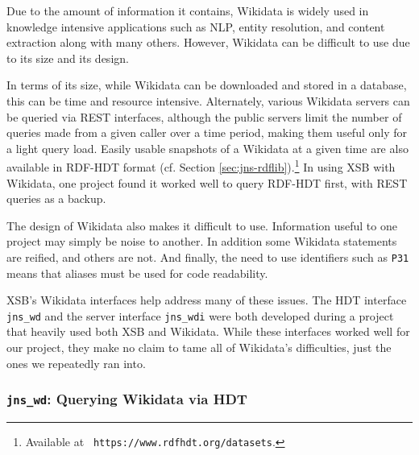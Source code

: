 Due to the amount of information it contains, Wikidata is widely used
in knowledge intensive applications such as NLP, entity resolution,
and content extraction along with many others.  However, Wikidata can
be difficult to use due to its size and its design.

In terms of its size, while Wikidata can be downloaded and stored in a
database, this can be time and resource intensive.  Alternately,
various Wikidata servers can be queried via REST interfaces, although
the public servers limit the number of queries made from a given
caller over a time period, making them useful only for a light query
load.  Easily usable snapshots of a Wikidata at a given time are also
available in RDF-HDT format (cf. Section
\ref{sec:jns-rdflib}).\footnote{Available at {\tt
  https://www.rdfhdt.org/datasets}.}  In using XSB with Wikidata, one
project found it worked well to query RDF-HDT first, with REST queries
as a backup.

The design of Wikidata also makes it difficult to use.  Information
useful to one project may simply be noise to another.  In addition
some Wikidata statements are reified, and others are not.  And
finally, the need to use identifiers such as {\tt P31} means that
aliases must be used for code readability.

XSB's Wikidata interfaces help address many of these issues. The HDT
interface {\tt jns\_wd} and the server interface {\tt jns\_wdi} were
both developed during a project that heavily used both XSB and
Wikidata.  While these interfaces worked well for our project, they
make no claim to tame all of Wikidata's difficulties, just the ones we
repeatedly ran into.

\subsubsection{{\tt jns\_wd}: Querying Wikidata via HDT}

